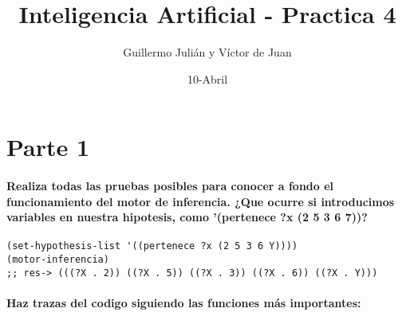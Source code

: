 \documentclass[nochap]{apuntes}
\author{Guillermo Julián y Víctor de Juan}
\date{10-Abril}
\title{Inteligencia Artificial - Practica 4}
\begin{document}
\maketitle
\section*{Parte 1}
\paragraph{Realiza todas las pruebas posibles para conocer a fondo el funcionamiento del motor de inferencia. ¿Que ocurre si introducimos variables en nuestra hipotesis, como '(pertenece ?x (2 5 3 6 7))?}

\begin{lstlisting}
(set-hypothesis-list '((pertenece ?x (2 5 3 6 Y))))
(motor-inferencia)
;; res-> (((?X . 2)) ((?X . 5)) ((?X . 3)) ((?X . 6)) ((?X . Y)))
\end{lstlisting}


\paragraph{ Haz trazas del codigo siguiendo las funciones más importantes:}
\end{document}
